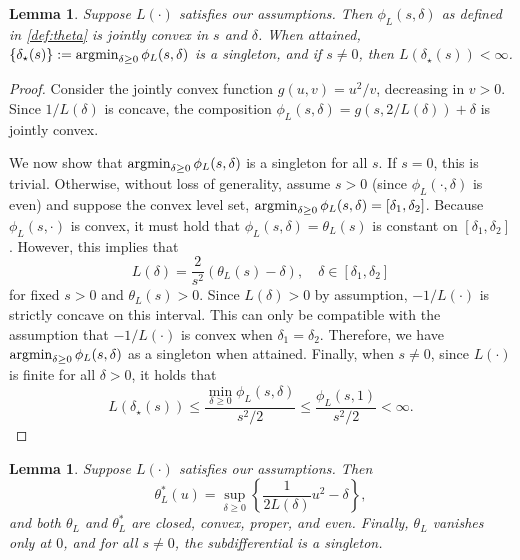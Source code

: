 \documentclass[11pt, hidelinks]{article}
\numberwithin{equation}{section}
\newcommand{\argmin}{\operatornamewithlimits{argmin}}
\theoremstyle{thmstyletwo}%
\newtheorem{lemma}[thm]{Lemma}
\numberwithin{equation}{section}
\begin{document}
\begin{lemma}\label{lemma:phi_calc}
    Suppose $L(\cdot)$ satisfies our assumptions. Then $\phi_L(s,\delta)$ as defined in \eqref{def:theta} is jointly convex in $s$ and $\delta$. When attained, $\{\delta_\star(s)\} := \argmin_{\delta \geq 0} \phi_L(s,\delta)$ is a singleton, and if $s \ne 0$, then $L(\delta_\star(s)) < \infty$.
\end{lemma}
\begin{proof}
   Consider the jointly convex function $g(u,v) = u^2/v$, decreasing in $v > 0$. Since $1/L(\delta)$ is concave, the composition $\phi_L(s,\delta) = g(s, 2/L(\delta)) + \delta$ is jointly convex. 
   
   We now show that $\argmin_{\delta \geq 0} \phi_L(s,\delta)$ is a singleton for all $s$. If $ s = 0$, this is trivial. Otherwise, without loss of generality, assume $s > 0$ (since $\phi_L(\cdot,\delta)$ is even) and suppose the convex level set, $\argmin_{\delta \geq 0} \phi_L(s,\delta) = [\delta_1, \delta_2]$. Because $\phi_L(s,\cdot)$ is convex, it must hold that $\phi_L(s,\delta)  = \theta_L(s)$ is constant on $[\delta_1, \delta_2]$. However, this implies that $$L(\delta) = \frac{2}{s^2}(\theta_L(s) - \delta), \quad \delta \in [\delta_1, \delta_2]$$ for fixed $s > 0$ and $\theta_L(s) > 0$. Since $L(\delta) > 0$ by assumption, $-1/L(\cdot)$ is strictly concave on this interval. This can only be compatible with the assumption that $-1/L(\cdot)$ is convex when $\delta_1 = \delta_2$. Therefore, we have $\argmin_{\delta \geq 0} \phi_L(s,\delta)$ as a singleton when attained. Finally, when $s \ne 0$, since $L(\cdot)$ is finite for all $\delta > 0$, it holds that
   $$L(\delta_\star(s)) \leq \frac{\min_{\delta \geq 0} \phi_L(s,\delta)}{s^2/2} \leq \frac{\phi_L(s,1)}{s^2/2} < \infty.  $$
\end{proof}
\begin{lemma}\label{lemma:theta_L-and-conjugate_properties}
    Suppose $L(\cdot)$ satisfies our assumptions. Then $$\theta_L^*(u) =\sup_{\delta \geq 0}\left\{\frac{1}{2L(\delta)}u^2-\delta\right\},$$ and both $\theta_L$ and $\theta_L^*$ are closed, convex, proper, and even.  Finally, $\theta_L$ vanishes only at $0$, and for all $s \ne 0$, the subdifferential is a singleton.
\end{lemma}
\end{document}

